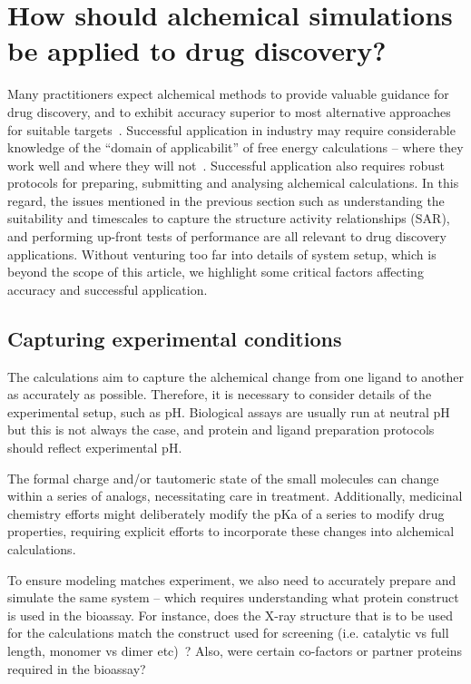 \documentclass[9pt,bestpractices]{livecoms}
\begin{document}
\section{How should alchemical simulations be applied to drug discovery?}
\label{sec:drugdiscovery}
Many practitioners expect alchemical methods to provide valuable guidance for drug discovery, and to exhibit accuracy superior to most alternative approaches for suitable targets~\cite{kuhn2017prospective}. Successful application in industry may require considerable knowledge of the ``domain of applicabilit'' of free energy calculations -- where they work well and where they will not~\cite{sherborne2016collaborating}. Successful application also requires robust protocols for preparing, submitting and analysing alchemical calculations. In this regard, the issues mentioned in the previous section such as understanding the suitability and timescales to capture the structure activity relationships (SAR), and performing up-front tests of performance are all relevant to drug discovery applications. Without venturing too far into details of system setup, which is beyond the scope of this article, we highlight some critical factors affecting accuracy and successful application. 
%
\subsection{Capturing experimental conditions}
The calculations aim to capture the alchemical change from one ligand to another as accurately as possible. Therefore, it is necessary to consider details of the experimental setup, such as pH. Biological assays are usually run at neutral pH but this is not always the case, and protein and ligand preparation protocols should reflect experimental pH. 

The formal charge and/or tautomeric state of the small molecules can change within a series of analogs, necessitating care in treatment. Additionally, medicinal chemistry efforts might deliberately modify the pKa of a series to modify drug properties, requiring explicit efforts to incorporate these changes into alchemical calculations.

To ensure modeling matches experiment, we also need to accurately prepare and  simulate the same system -- which requires understanding what protein construct is used in the bioassay. For instance, does the X-ray structure that is to be used for the calculations match the construct used for screening (i.e. catalytic vs full length, monomer vs dimer etc)~\cite{perez-benito2018predicting}? Also, were certain co-factors or partner proteins required in the bioassay? 
%
\end{document}

